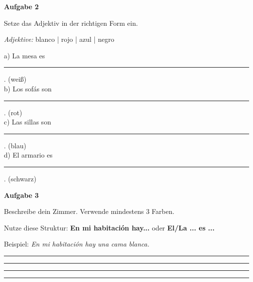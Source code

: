 \documentclass[11pt, a4paper]{article}
\newcommand{\fachfarbe}{spanisch}
\newcommand{\punktebox}[1]{\hfill\fbox{\small \_/#1}}
\newcommand{\luecke}[1]{\rule{#1}{0.4pt}}
\newenvironment{aufgabe}[1]{%
    \needspace{5\baselineskip}%
    \nopagebreak[4]%
    \vspace{10pt}
    \noindent\textbf{\textcolor{\fachfarbe}{Aufgabe #1}}
    \nopagebreak[4]%
    \vspace{5pt}
    \nopagebreak[4]%
    \begin{list}{}{\leftmargin=0pt}
    \item[]
}{%
    \end{list}
}
\newcommand{\es}[1]{\textcolor{\fachfarbe}{\textbf{#1}}}
\begin{document}
\vspace{15pt}


\begin{aufgabe}{2}
Setze das Adjektiv in der richtigen Form ein. \punktebox{4}
\end{aufgabe}

\begin{vokabelkasten}
\textit{Adjektive:} blanco | rojo | azul | negro
\end{vokabelkasten}

\vspace{0.5em}

\noindent
a) La mesa es \luecke{3cm}. (weiß) \\[0.8em]
b) Los sofás son \luecke{3cm}. (rot) \\[0.8em]
c) Las sillas son \luecke{3cm}. (blau) \\[0.8em]
d) El armario es \luecke{3cm}. (schwarz) \\

\vspace{15pt}


\begin{aufgabe}{3}
Beschreibe dein Zimmer. Verwende mindestens 3 Farben. \punktebox{6}
\end{aufgabe}

\begin{hinweis}
Nutze diese Struktur: \es{En mi habitación hay...} oder \es{El/La ... es ...}
\end{hinweis}

\vspace{0.5em}

\noindent
Beispiel: \textit{En mi habitación hay una cama blanca.}

\vspace{0.5em}

\noindent
\rule{\textwidth}{0.4pt}\vspace{8pt}
\rule{\textwidth}{0.4pt}\vspace{8pt}
\rule{\textwidth}{0.4pt}\vspace{8pt}
\rule{\textwidth}{0.4pt}

\vspace{15pt}
\end{document}
